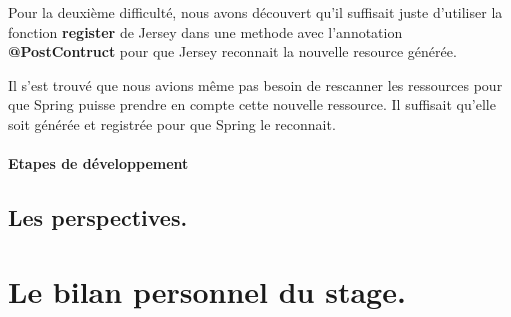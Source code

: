 Pour la deuxième difficulté, nous avons découvert qu'il suffisait juste d'utiliser la fonction \textbf{register} de Jersey dans une methode avec l'annotation \textbf{@PostContruct} pour que Jersey reconnait la nouvelle resource générée.

Il s'est trouvé que nous avions même pas besoin de rescanner les ressources pour que Spring puisse prendre en compte cette nouvelle ressource. Il suffisait qu'elle soit générée et registrée pour que Spring le reconnait.

\subsubsection{Etapes de développement}
\label{etapesdedveloppement}

\section{Les perspectives.}
\label{lesperspectives.}

\chapter{Le bilan personnel du stage.}
\label{lebilanpersonneldustage.}
